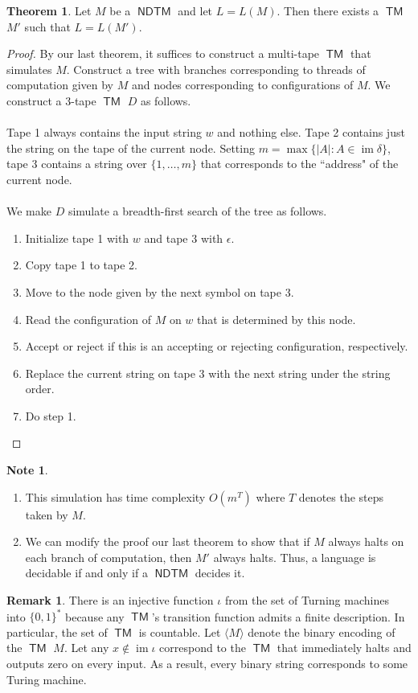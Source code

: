 \documentclass[10pt,letterpaper,cm]{nupset}
\theoremstyle{definition}
\newtheorem{note}{Note}
\newtheorem{remark}{Remark}
\newtheorem{theorem}{Theorem}
\newcommand{\1}{\mathbf{1}}
\newcommand{\0}{\vec 0}
\DeclareMathOperator{\im}{im}
\DeclareMathOperator{\TM}{\mathsf{TM}}
\DeclareMathOperator{\NDTM}{\mathsf{NDTM}}
\begin{document}
\begin{theorem}
Let $M$ be a $\NDTM$ and let $L = L(M)$. Then there exists a $\TM$ $M'$ such that $L= L(M')$. 
\end{theorem}
\begin{proof}
By our last theorem, it suffices to construct a multi-tape $\TM$ that simulates $M$. Construct a tree with branches corresponding to threads of computation given by $M$ and nodes corresponding to configurations of $M$. We construct a $3$-tape $\TM$ $D$ as follows. 
\\ \\ Tape 1 always contains the input string $w$ and nothing else. Tape 2 contains just the string on the tape of the current node. Setting $m = \max\{ |A| : A \in \im{\delta} \}$, tape 3 contains a string over $\{1, \ldots, m\}$ that corresponds to the ``address" of the current node. 
\\ \\ We make $D$ simulate a breadth-first search of the tree as follows. 
\begin{enumerate}
\item Initialize  tape 1 with $w$ and tape $3$ with $\epsilon$. 
\item Copy tape 1 to tape 2.
\item Move to the node given by the next symbol on tape 3.
\item Read the configuration of $M$ on $w$ that is determined by this node.
\item Accept or reject if this is an accepting or rejecting configuration, respectively. 
\item Replace the current string on tape 3 with the next string under the string order.
\item Do step 1.
\end{enumerate}
\end{proof}

\begin{note} $ $
\begin{enumerate}
\item This simulation has time complexity $O(m^T)$ where $T$ denotes the steps taken by $M$.
\item We can modify the proof our last theorem to show that if $M$ always halts on each branch of computation, then $M'$ always halts. Thus, a language is decidable if and only if a $\NDTM$ decides it.
\end{enumerate}
\end{note}

\begin{remark}
There is an injective function $\iota$ from the set of Turning machines into $\{0,1\}^{\ast}$ because any $\TM$'s transition function admits a finite description. In particular, the set of $\TM$ is countable. Let $\langle M \rangle $ denote the binary encoding of the $\TM$ $M$. Let any $x\notin \im{\iota}$ correspond to the $\TM$ that immediately halts and outputs zero on every input. As a result, every binary string corresponds to some Turing machine. 
\end{remark}
\end{document}
